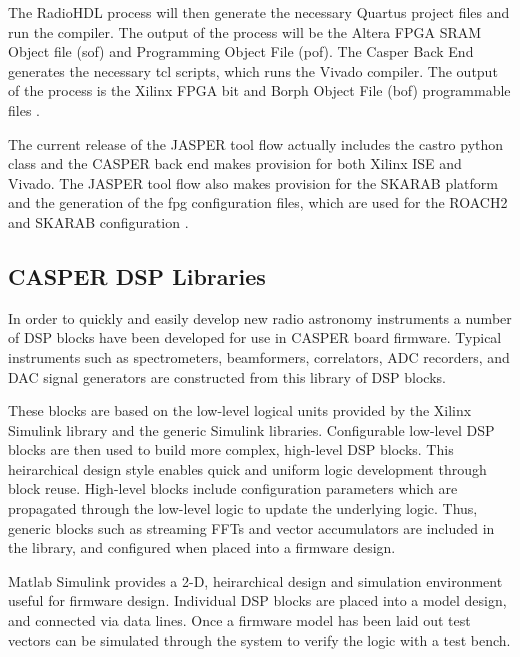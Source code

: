 \documentclass{ws-jai}
\begin{document}
The RadioHDL process will then generate the necessary Quartus project files and run the compiler. The output of the process will be the Altera FPGA SRAM Object file (sof) and Programming Object File (pof). The Casper Back End generates the necessary tcl scripts, which runs the Vivado compiler. The output of the process is the Xilinx FPGA bit and Borph Object File (bof) programmable files \cite{Isaac16}.

The current release of the JASPER tool flow actually includes the castro python class and the CASPER back end makes provision for both Xilinx ISE and Vivado. The JASPER tool flow also makes provision for the SKARAB platform and the generation of the fpg configuration files, which are used for the ROACH2 and SKARAB configuration \cite{Balla16}.


\subsection{CASPER DSP Libraries}



In order to quickly and easily develop new radio astronomy instruments a number
of DSP blocks have been developed for use in CASPER board firmware. Typical
instruments such as spectrometers, beamformers, correlators, ADC recorders, and
DAC signal generators are constructed from this library of DSP blocks.

These blocks are based on the low-level logical units provided by the Xilinx
Simulink library and the generic Simulink libraries. Configurable low-level DSP
blocks are then used to build more complex, high-level DSP blocks. This
heirarchical design style enables quick and uniform logic development through
block reuse. High-level blocks include configuration parameters which are
propagated through the low-level logic to update the underlying logic. Thus,
generic blocks such as streaming FFTs and vector accumulators are included in
the library, and configured when placed into a firmware design.

Matlab Simulink provides a 2-D, heirarchical design and simulation environment
useful for firmware design. Individual DSP blocks are placed into a model
design, and connected via data lines. Once a firmware model has been laid out
test vectors can be simulated through the system to verify the logic with a test
bench.
\end{document}
